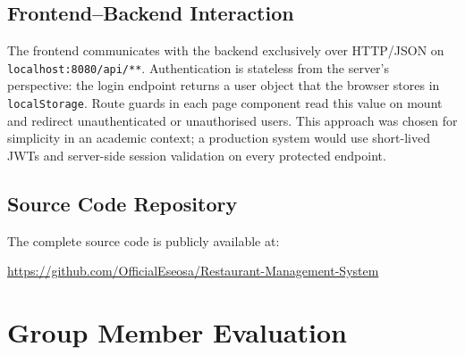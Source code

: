 \documentclass[12pt,a4paper]{article}
\begin{document}
\subsection{Frontend--Backend Interaction}

The frontend communicates with the backend exclusively over HTTP/JSON on
\texttt{localhost:8080/api/**}. Authentication is stateless from the server's
perspective: the login endpoint returns a user object that the browser stores in
\texttt{localStorage}. Route guards in each page component read this value on
mount and redirect unauthenticated or unauthorised users. This approach was
chosen for simplicity in an academic context; a production system would use
short-lived JWTs and server-side session validation on every protected endpoint.

\subsection{Source Code Repository}

The complete source code is publicly available at:

\begin{center}
\url{https://github.com/OfficialEseosa/Restaurant-Management-System}
\end{center}

\section{Group Member Evaluation}
\end{document}

